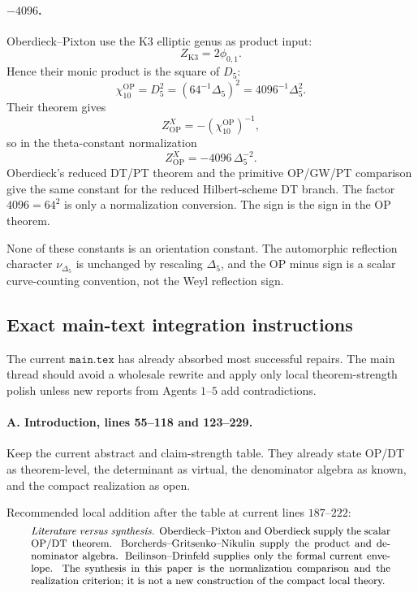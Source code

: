 \paragraph{\(-4096\).}
Oberdieck--Pixton use the K3 elliptic genus as product input:
\[
Z_{\mathrm{K3}}=2\phi_{0,1}.
\]
Hence their monic product is the square of \(D_5\):
\[
\chi_{10}^{\mathrm{OP}}=D_5^2
=(64^{-1}\Delta_5)^2
=4096^{-1}\Delta_5^2.
\]
Their theorem gives
\[
Z^X_{\mathrm{OP}}=-\left(\chi_{10}^{\mathrm{OP}}\right)^{-1},
\]
so in the theta-constant normalization
\[
Z^X_{\mathrm{OP}}=-4096\,\Delta_5^{-2}.
\]
Oberdieck's reduced DT/PT theorem and the primitive OP/GW/PT comparison
give the same constant for the reduced Hilbert-scheme DT branch.  The
factor \(4096=64^2\) is only a normalization conversion.  The sign is
the sign in the OP theorem.

None of these constants is an orientation constant.  The automorphic
reflection character \(\nu_{\Delta_5}\) is unchanged by rescaling
\(\Delta_5\), and the OP minus sign is a scalar curve-counting
convention, not the Weyl reflection sign.

\subsection{Exact main-text integration instructions}

The current \(\texttt{main.tex}\) has already absorbed most successful
repairs.  The main thread should avoid a wholesale rewrite and apply
only local theorem-strength polish unless new reports from Agents
\(1\)--\(5\) add contradictions.

\paragraph{A. Introduction, lines 55--118 and 123--229.}
Keep the current abstract and claim-strength table.  They already state
OP/DT as theorem-level, the determinant as virtual, the denominator
algebra as known, and the compact realization as open.

Recommended local addition after the table at current lines
\(187\)--\(222\):
\[
\begin{minipage}{0.92\textwidth}
\small
\emph{Literature versus synthesis.}
Oberdieck--Pixton and Oberdieck supply the scalar OP/DT theorem.
Borcherds--Gritsenko--Nikulin supply the product and denominator
algebra.  Beilinson--Drinfeld supplies only the formal current envelope.
The synthesis in this paper is the normalization comparison and the
realization criterion; it is not a new construction of the compact
local theory.
\end{minipage}
\]

